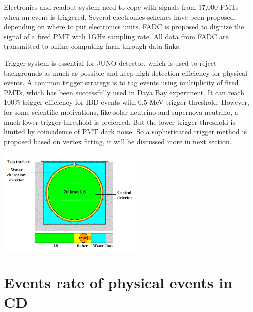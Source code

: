 \documentclass[a4paper,10pt,twoside]{paper}
\begin{document}
\begin{multicols}{2}
                Electronics and readout system need to cope with signals from 17,000 PMTs when an event is triggered.
                Several electronics schemes have been proposed, depending on where to put electronics units.
                FADC is proposed to digitize the signal of a fired PMT with 1GHz sampling rate.
                All data from FADC are transmitted to online computing farm through data links.

                Trigger system is essential for JUNO detector, which is used to reject backgrounds as much as possible and keep high detection efficiency for physical events.
                A common trigger strategy is to tag events using multiplicity of fired PMTs, which has been successfully used in Daya Bay experiment. It can reach 100\% trigger
                efficiency for IBD events with 0.5 MeV trigger threshold. However, for some scientific motivations, like solar neutrino and supernova neutrino, a much lower 
                trigger threshold is preferred. But the lower trigger threshold is limited by coincidence of PMT dark noise. 
                So a sophisticated trigger method is proposed based on vertex fitting, it will be discussed more in next section.
                
		\begin{center}
			\includegraphics[width=7cm]{CD.png}
		\end{center}


		\section{Events rate of physical events in CD}


\end{multicols}
\end{document}

